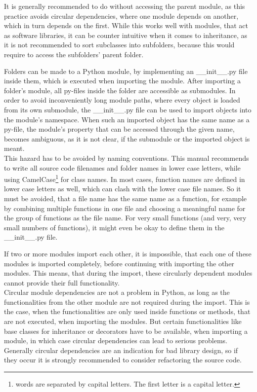 			It is generally recommended to do without accessing the parent module, as this practice avoids circular dependencies, where one module depends on another, which in turn depends on the first.
			While this works well with modules, that act as software libraries, it can be counter intuitive when it comes to inheritance, as it is not recommended to sort subclasses into subfolders, because this would require to access the subfolders' parent folder.

			Folders can be made to a Python module, by implementing an \_\_init\_\_.py file inside them, which is executed when importing the module.
			After importing a folder's module, all py-files inside the folder are accessible as submodules.
			In order to avoid inconveniently long module paths, where every object is loaded from its own submodule, the \_\_init\_\_.py file can be used to import objects into the module's namespace.
			When such an imported object has the same name as a py-file, the module's property that can be accessed through the given name, becomes ambiguous, as it is not clear, if the submodule or the imported object is meant.\\
			This hazard has to be avoided by naming conventions.
			This manual recommends to write all source code filenames and folder names in lower case letters, while using CamelCase\footnote{words are separated by capital letters. The first letter is a capital letter.} for class names.
			In most cases, function names are defined in lower case letters as well, which can clash with the lower case file names.
			So it must be avoided, that a file name has the same name as a function, for example by combining multiple functions in one file and choosing a meaningful name for the group of functions as the file name.
			For very small functions (and very, very small numbers of functions), it might even be okay to define them in the \_\_init\_\_.py file.

			\label{CircularImports}
			If two or more modules import each other, it is impossible, that each one of these modules is imported completely, before continuing with importing the other modules.
			This means, that during the import, these circularly dependent modules cannot provide their full functionality.\\
			Circular module dependencies are not a problem in Python, as long as the functionalities from the other module are not required during the import.
			This is the case, when the functionalities are only used inside functions or methods, that are not executed, when importing the modules.
			But certain functionalities like base classes for inheritance or decorators have to be available, when importing a module, in which case circular dependencies can lead to serious problems.\\
			Generally circular dependencies are an indication for bad library design, so if they occur it is strongly recommended to consider refactoring the source code.

